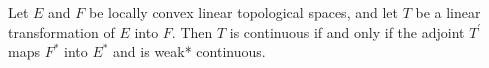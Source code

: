 Let $E$ and $F$ be locally convex linear topological spaces, and let $T$ be a linear transformation of $E$ into $F$. Then $T$ is continuous if and only if the adjoint $T^{\prime}$ maps $F^{*}$ into $E^{*}$ and is weak* continuous.
